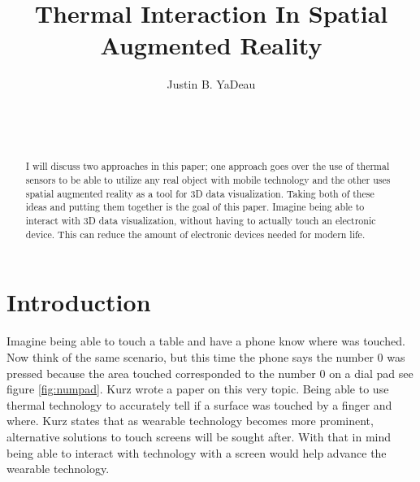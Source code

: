 \documentclass{sig-alternate}
\begin{document}

\title{Thermal Interaction In Spatial Augmented Reality}


\author{
\alignauthor
Justin B. YaDeau\\
	\\
	\\
	\\
}

\maketitle

\begin{abstract}
I will discuss two approaches in this paper; one approach goes over the use of thermal sensors to be able to utilize any real object with mobile technology and the other uses spatial augmented reality as a tool for 3D data visualization. Taking both of these ideas and putting them together is the goal of this paper. Imagine being able to interact with 3D data visualization, without having to actually touch an electronic device. This can reduce the amount of electronic devices needed for modern life.
\end{abstract}


\section{Introduction}
\label{sec:Introduction}
Imagine being able to touch a table and have a phone know where was touched. Now think of the same scenario, but this time the phone says the number 0 was pressed because the area touched corresponded to the number 0 on a dial pad see figure \ref{fig:numpad}. Kurz \cite{Thermal} wrote a paper on this very topic. Being able to use thermal technology to accurately tell if a surface was touched by a finger and where. Kurz \cite{Thermal} states that as wearable technology becomes more prominent, alternative solutions to touch screens will be sought after. With that in mind being able to interact with technology with a screen would help advance the wearable technology.    
\end{document}
